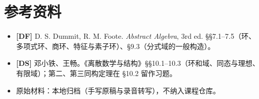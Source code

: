 \documentclass[UTF8,a4paper,11pt]{ctexart}
\begin{document}
\section*{参考资料}
\begin{itemize}
\item \textbf{[DF]} D. S. Dummit, R. M. Foote. \emph{Abstract Algebra}, 3rd ed. §§7.1--7.5（环、多项式环、商环、特征与素子环）、§9.3（分式域的一般构造）。
\item \textbf{[DS]} 邓小铁、王畅。《离散数学与结构》§§10.1--10.3（环和域、同态与理想、有限域）；第二、第三同构定理在 §10.2 留作习题。
\item 原始材料：本地归档（手写原稿与录音转写），不纳入课程仓库。
\end{itemize}
\end{document}

